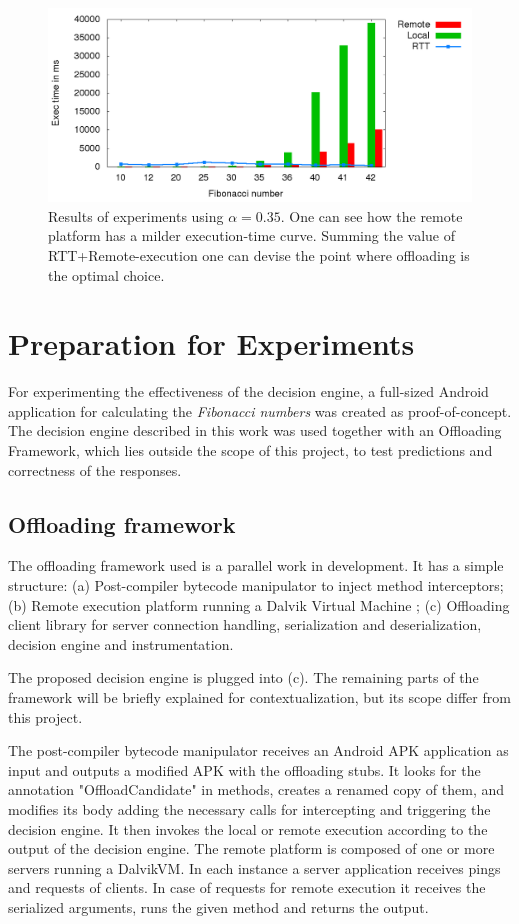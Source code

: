\documentclass[10pt, conference, letterpaper]{IEEEtran}
\begin{document}
\begin{figure}[!t]
  \centering
  \includegraphics[width=1\textwidth]{plots/executions/executions.png}
  \caption{Results of experiments using $\alpha = 0.35$. One can see how the remote platform has a milder execution-time curve. Summing the value of RTT+Remote-execution one can devise the point where offloading is the optimal choice.}
  \label{fig:exectime}
\end{figure}

  \section{Preparation for Experiments}
  For experimenting the effectiveness of the decision engine, a full-sized Android application for calculating the \textit{Fibonacci numbers} was created as proof-of-concept. The decision engine described in this work was used together with an Offloading Framework, which lies outside the scope of this project, to test predictions and correctness of the responses.

  \subsection{Offloading framework}
  The offloading framework used is a parallel work in development. It has a simple structure: (a) Post-compiler bytecode manipulator to inject method interceptors; (b) Remote execution platform running a Dalvik Virtual Machine \cite{ehringer2010dalvik}; (c) Offloading client library for server connection handling, serialization and deserialization, decision engine and instrumentation.

  The proposed decision engine is plugged into (c). The remaining parts of the framework will be briefly explained for contextualization, but its scope differ from this project.

  The post-compiler bytecode manipulator receives an Android APK application as input and outputs a modified APK with the offloading stubs. It looks for the annotation "OffloadCandidate" in methods, creates a renamed copy of them, and modifies its body adding the necessary calls for intercepting and triggering the decision engine. It then invokes the local or remote execution according to the output of the decision engine. The remote platform is composed of one or more servers running a DalvikVM. In each instance a server application receives pings and requests of clients. In case of requests for remote execution it receives the serialized arguments, runs the given method and returns the output.
\end{document}
